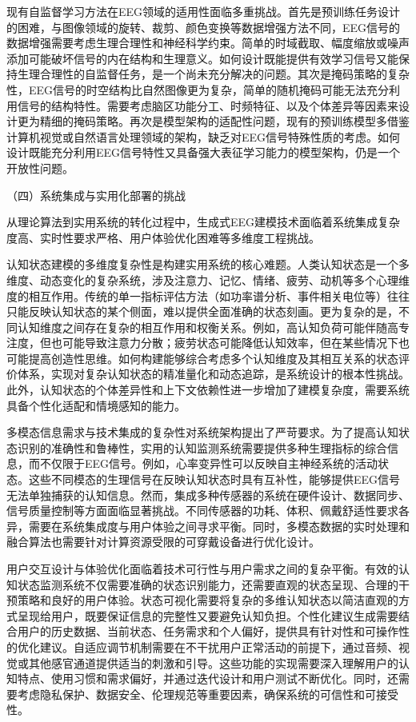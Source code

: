 现有自监督学习方法在EEG领域的适用性面临多重挑战。首先是预训练任务设计的困难，与图像领域的旋转、裁剪、颜色变换等数据增强方法不同，EEG信号的数据增强需要考虑生理合理性和神经科学约束。简单的时域截取、幅度缩放或噪声添加可能破坏信号的内在结构和生理意义。如何设计既能提供有效学习信号又能保持生理合理性的自监督任务，是一个尚未充分解决的问题。其次是掩码策略的复杂性，EEG信号的时空结构比自然图像更为复杂，简单的随机掩码可能无法充分利用信号的结构特性。需要考虑脑区功能分工、时频特征、以及个体差异等因素来设计更为精细的掩码策略。再次是模型架构的适配性问题，现有的预训练模型多借鉴计算机视觉或自然语言处理领域的架构，缺乏对EEG信号特殊性质的考虑。如何设计既能充分利用EEG信号特性又具备强大表征学习能力的模型架构，仍是一个开放性问题。

（四）系统集成与实用化部署的挑战

从理论算法到实用系统的转化过程中，生成式EEG建模技术面临着系统集成复杂度高、实时性要求严格、用户体验优化困难等多维度工程挑战。

认知状态建模的多维度复杂性是构建实用系统的核心难题。人类认知状态是一个多维度、动态变化的复杂系统，涉及注意力、记忆、情绪、疲劳、动机等多个心理维度的相互作用。传统的单一指标评估方法（如功率谱分析、事件相关电位等）往往只能反映认知状态的某个侧面，难以提供全面准确的状态刻画。更为复杂的是，不同认知维度之间存在复杂的相互作用和权衡关系。例如，高认知负荷可能伴随高专注度，但也可能导致注意力分散；疲劳状态可能降低认知效率，但在某些情况下也可能提高创造性思维。如何构建能够综合考虑多个认知维度及其相互关系的状态评价体系，实现对复杂认知状态的精准量化和动态追踪，是系统设计的根本性挑战。此外，认知状态的个体差异性和上下文依赖性进一步增加了建模复杂度，需要系统具备个性化适配和情境感知的能力。

多模态信息需求与技术集成的复杂性对系统架构提出了严苛要求。为了提高认知状态识别的准确性和鲁棒性，实用的认知监测系统需要提供多种生理指标的综合信息，而不仅限于EEG信号。例如，心率变异性可以反映自主神经系统的活动状态。这些不同模态的生理信号在反映认知状态时具有互补性，能够提供EEG信号无法单独捕获的认知信息。然而，集成多种传感器的系统在硬件设计、数据同步、信号质量控制等方面面临显著挑战。不同传感器的功耗、体积、佩戴舒适性要求各异，需要在系统集成度与用户体验之间寻求平衡。同时，多模态数据的实时处理和融合算法也需要针对计算资源受限的可穿戴设备进行优化设计。

用户交互设计与体验优化面临着技术可行性与用户需求之间的复杂平衡。有效的认知状态监测系统不仅需要准确的状态识别能力，还需要直观的状态呈现、合理的干预策略和良好的用户体验。状态可视化需要将复杂的多维认知状态以简洁直观的方式呈现给用户，既要保证信息的完整性又要避免认知负担。个性化建议生成需要结合用户的历史数据、当前状态、任务需求和个人偏好，提供具有针对性和可操作性的优化建议。自适应调节机制需要在不干扰用户正常活动的前提下，通过音频、视觉或其他感官通道提供适当的刺激和引导。这些功能的实现需要深入理解用户的认知特点、使用习惯和需求偏好，并通过迭代设计和用户测试不断优化。同时，还需要考虑隐私保护、数据安全、伦理规范等重要因素，确保系统的可信性和可接受性。


